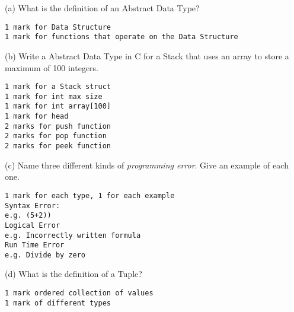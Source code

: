 \documentclass{exam}
\begin{document}
\begin{question}
\item[(a)]
What is the definition of an Abstract Data Type?
\color{red}
\begin{lstlisting}
1 mark for Data Structure
1 mark for functions that operate on the Data Structure
\end{lstlisting}
\color{black}

\item[(b)]
Write a Abstract Data Type in C for a Stack that uses an array to store a maximum of 100 integers. 
\color{red}
\begin{lstlisting}
1 mark for a Stack struct 
1 mark for int max size
1 mark for int array[100]
1 mark for head
2 marks for push function
2 marks for pop function
2 marks for peek function
\end{lstlisting}
\color{black}

\item[(c)]
Name three different kinds of {\em programming error}. Give an example of each one.
\color{red}
\begin{lstlisting}
1 mark for each type, 1 for each example
Syntax Error:
e.g. (5+2))
Logical Error
e.g. Incorrectly written formula
Run Time Error
e.g. Divide by zero
\end{lstlisting}
\color{black}

\item[(d)]
What is the definition of a Tuple?
\color{red}
\begin{lstlisting}
1 mark ordered collection of values
1 mark of different types
\end{lstlisting}
\color{black}

\end{question}
\clearpage
\end{document}

